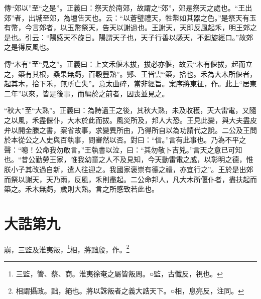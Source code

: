 {\noindent\zhuan{}\fzbyks 傳“郊以”至“之是”。正義曰：祭天於南郊，故謂之“郊”，郊是祭天之處也。“王出郊”者，出城至郊，為壇告天也。云：“以蒼璧禮天，牲幣如其器之色。”是祭天有玉有幣，今言郊者，以玉幣祭天，告天以謝過也。王謝天，天即反風起禾，明王郊之是也。引云：“陽感天不旋日。陽謂天子也，天子行善以感天，不迴旋經口。”故郊之是得反風也。 \par}

{\noindent\zhuan{}\fzbyks 傳“木有”至“見之”。正義曰：上文禾偃木拔，拔必亦偃，故云“木有偃拔，起而立之，築有其根，桑果無虧，百穀豐熟”。鄭、王皆雲“築，拾也。禾為大木所偃者，起其木，拾下禾，無所亡失”。意太曲碎，當非經旨。案序將東征，作。此上“居東二年”以來，皆是後事，而編於之前者，因喪並見之。 \par}

{\noindent\shu{}\fzkt “秋大”至“大熟”。正義曰：為詩遺王之後，其秋大熟，未及收穫，天大雷電，又隨之以風，禾盡偃仆，大木於此而拔。風災所及，邦人大恐。王見此變，與大夫盡皮弁以開金縢之書，案省故事，求變異所由，乃得所自以為功請代之說。二公及王問於本從公之人史與百執事，問審然以否。對曰：“信。”言有此事也。乃為不平之聲：“噫！公命我勿敢言。”王執書以泣，曰：“其勿敬卜吉兇。”言天之意已可知也。“昔公勤勞王家，惟我幼童之人不及見知，今天動雷電之威，以彰明之德，惟朕小子其改過自新，遣人往迎之。我國家褒崇有德之禮，亦宜行之”。王於是出郊而祭以謝天，天乃雨，反風，禾則盡起。二公命邦人，凡大木所偃仆者，盡扶起而築之。禾木無虧，歲則大熟。言之所感致若此也。 \par}

\section{大誥第九}


崩，三監及淮夷叛，\footnote{三監，管、蔡、商。淮夷徐奄之屬皆叛周。○監，古懺反，視也。}相，將黜殷，作。\footnote{相謂攝政。黜，絕也。將以誅叛者之義大誥天下。○相，息亮反，注同。}

